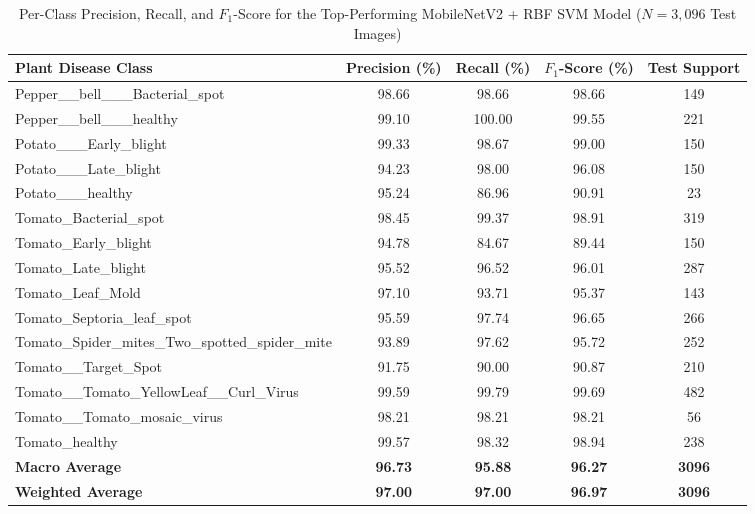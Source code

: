 \begin{table}[htbp]
\caption{Per-Class Precision, Recall, and $F_1$-Score for the Top-Performing MobileNetV2 + RBF SVM Model ($N=3,096$ Test Images)}
\label{tab:per_class_mobilenet_svm}
\centering
\small
\begin{tabular}{lcccc}
\toprule
\textbf{Plant Disease Class} & \textbf{Precision (\%)} & \textbf{Recall (\%)} & \textbf{$F_1$-Score (\%)} & \textbf{Test Support} \\
\midrule
Pepper\_\_bell\_\_\_Bacterial\_spot & 98.66 & 98.66 & 98.66 & 149 \\
Pepper\_\_bell\_\_\_healthy & 99.10 & 100.00 & 99.55 & 221 \\
Potato\_\_\_Early\_blight & 99.33 & 98.67 & 99.00 & 150 \\
Potato\_\_\_Late\_blight & 94.23 & 98.00 & 96.08 & 150 \\
Potato\_\_\_healthy & 95.24 & 86.96 & 90.91 & 23 \\
Tomato\_Bacterial\_spot & 98.45 & 99.37 & 98.91 & 319 \\
Tomato\_Early\_blight & 94.78 & 84.67 & 89.44 & 150 \\
Tomato\_Late\_blight & 95.52 & 96.52 & 96.01 & 287 \\
Tomato\_Leaf\_Mold & 97.10 & 93.71 & 95.37 & 143 \\
Tomato\_Septoria\_leaf\_spot & 95.59 & 97.74 & 96.65 & 266 \\
Tomato\_Spider\_mites\_Two\_spotted\_spider\_mite & 93.89 & 97.62 & 95.72 & 252 \\
Tomato\_\_Target\_Spot & 91.75 & 90.00 & 90.87 & 210 \\
Tomato\_\_Tomato\_YellowLeaf\_\_Curl\_Virus & 99.59 & 99.79 & 99.69 & 482 \\
Tomato\_\_Tomato\_mosaic\_virus & 98.21 & 98.21 & 98.21 & 56 \\
Tomato\_healthy & 99.57 & 98.32 & 98.94 & 238 \\
\midrule
\textbf{Macro Average} & \textbf{96.73} & \textbf{95.88} & \textbf{96.27} & \textbf{3096} \\
\textbf{Weighted Average} & \textbf{97.00} & \textbf{97.00} & \textbf{96.97} & \textbf{3096} \\
\bottomrule
\end{tabular}
\end{table}